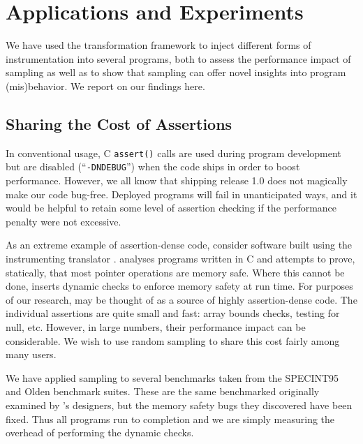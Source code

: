 \section{Applications and Experiments}
\label{sec:applications}

We have used the transformation framework to inject different forms of
instrumentation into several programs, both to assess the performance
impact of sampling as well as to show that sampling can offer novel
insights into program (mis)behavior.  We report on our findings here.

\subsection{Sharing the Cost of Assertions}

In conventional usage, C \texttt{assert()} calls are used during
program development but are disabled (``\texttt{-DNDEBUG}'') when the
code ships in order to boost performance.  However, we all know that
shipping release 1.0 does not magically make our code bug-free.
Deployed programs will fail in unanticipated ways, and it would be
helpful to retain some level of assertion checking if the performance
penalty were not excessive.

As an extreme example of assertion-dense code, consider software built
using the \ccured instrumenting translator \cite{POPL_'02*128}.
\ccured analyses programs written in C and attempts to prove,
statically, that most pointer operations are memory safe.  Where this
cannot be done, \ccured inserts dynamic checks to enforce memory
safety at run time.  For purposes of our research, \ccured may be
thought of as a source of highly assertion-dense code.  The individual
assertions are quite small and fast: array bounds checks, testing for
null, etc.  However, in large numbers, their performance impact can be
considerable.  We wish to use random sampling to share this cost
fairly among many users.

We have applied sampling to several benchmarks taken from the
SPECINT95 \cite{SPEC95} and Olden \cite{Carlisle:1996:OPPWDDSDMM}
benchmark suites.  These are the same benchmarked originally examined
by \ccured's designers, but the memory safety bugs they discovered
have been fixed.  Thus all programs run to completion and we are
simply measuring the overhead of performing the dynamic checks.


